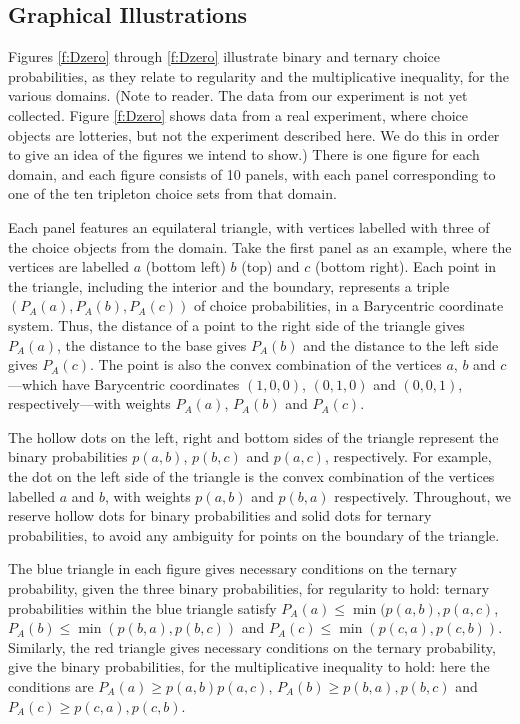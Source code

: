 \documentclass[11pt,letter]{article}
\begin{document}
\subsection{Graphical Illustrations}

Figures \ref{f:Dzero} through \ref{f:Dzero} illustrate binary and ternary choice probabilities, as they relate to regularity and the multiplicative inequality, for the various domains.
(Note to reader. The data from our experiment is not yet collected. Figure \ref{f:Dzero} shows data from a real experiment, where choice objects are lotteries, but not the experiment described here. We do this in order to give an idea of the figures we intend to show.)
There is one figure for each domain, and each figure consists of 10 panels, with each panel corresponding to one of the ten tripleton choice sets from that domain.

Each panel features an equilateral triangle, with vertices labelled with three of the choice objects from the domain.
Take the first panel as an example, where the vertices are labelled $a$ (bottom left) $b$ (top) and $c$ (bottom right).
Each point in the triangle, including the interior and the boundary, represents a triple $(P_A(a),P_A(b),P_A(c))$ of choice probabilities, in a Barycentric coordinate system.
Thus, the distance of a point to the right side of the triangle gives $P_A(a)$, the distance to the base gives $P_A(b)$ and the distance to the left side gives $P_A(c)$.
The point is also the convex combination of the vertices $a$, $b$ and $c$---which have Barycentric coordinates $(1,0,0)$, $(0,1,0)$ and $(0,0,1)$, respectively---with weights $P_A(a)$, $P_A(b)$ and $P_A(c)$.

The hollow dots on the left, right and bottom sides of the triangle represent the binary probabilities $p(a,b)$, $p(b,c)$ and $p(a,c)$, respectively.
For example, the dot on the left side of the triangle is the convex combination of the vertices labelled $a$ and $b$, with weights $p(a,b)$ and $p(b,a)$ respectively.
Throughout, we reserve hollow dots for binary probabilities and solid dots for ternary probabilities, to avoid any ambiguity for points on the boundary of the triangle.

The blue triangle in each figure gives necessary conditions on the ternary probability, given the three binary probabilities, for regularity to hold: ternary probabilities within the blue triangle satisfy $P_A(a) \leq \min(p(a,b), p(a,c)$, $P_A(b) \leq \min(p(b,a), p(b,c))$ and $P_A(c) \leq \min(p(c,a), p(c,b))$.
Similarly, the red triangle gives necessary conditions on the ternary probability, give the binary probabilities, for the multiplicative inequality to hold: here the conditions are $P_A(a) \geq p(a,b) p(a,c)$, $P_A(b) \geq p(b,a), p(b,c)$ and $P_A(c) \geq p(c,a), p(c,b)$.
\end{document}
